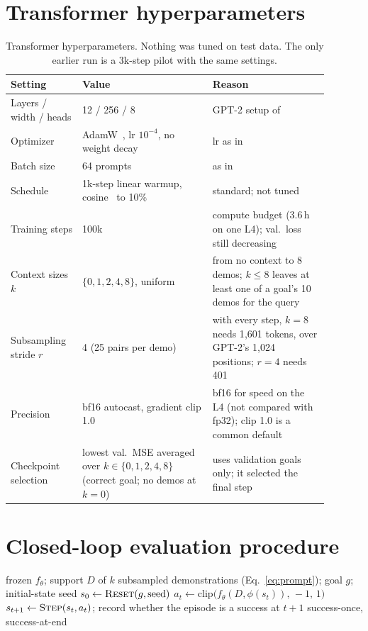 \section{Transformer hyperparameters}
\label{app:hparams}
\begin{table}[h]
\centering
\caption{Transformer hyperparameters. Nothing was tuned on test data. The only earlier run is a 3k-step pilot with the same settings.}
\label{tab:hparams}
\small
\begin{tabular}{p{0.19\linewidth}p{0.37\linewidth}p{0.33\linewidth}}
\toprule
Setting & Value & Reason \\
\midrule
Layers / width / heads & 12 / 256 / 8 & GPT-2 setup of~\cite{garg2022can} \\
Optimizer & AdamW~\cite{loshchilov2019adamw}, lr $10^{-4}$, no weight decay & lr as in~\cite{garg2022can} \\
Batch size & 64 prompts & as in~\cite{garg2022can} \\
Schedule & 1k-step linear warmup, cosine~\cite{loshchilov2017sgdr} to 10\% & standard; not tuned \\
Training steps & 100k & compute budget (3.6\,h on one L4); val.\ loss still decreasing \\
Context sizes $k$ & $\{0,1,2,4,8\}$, uniform & from no context to 8 demos; $k \le 8$ leaves at least one of a goal's 10 demos for the query \\
Subsampling stride $r$ & 4 (25 pairs per demo) & with every step, $k = 8$ needs 1{,}601 tokens, over GPT-2's 1{,}024 positions; $r = 4$ needs 401 \\
Precision & bf16 autocast, gradient clip 1.0 & bf16 for speed on the L4 (not compared with fp32); clip 1.0 is a common default \\
Checkpoint selection & lowest val.\ MSE averaged over $k \in \{0,1,2,4,8\}$ (correct goal; no demos at $k = 0$) & uses validation goals only; it selected the final step \\
\bottomrule
\end{tabular}
\end{table}

\section{Closed-loop evaluation procedure}
\label{app:procedures}
\begin{algorithm}[h]
\caption{Closed-loop evaluation of one condition (vectorized over the 512 episodes in practice)}
\label{alg:closed-loop}
\begin{algorithmic}[1]
\Require frozen $f_\theta$; support $D$ of $k$ subsampled demonstrations (Eq.~\ref{eq:prompt}); goal $g$; initial-state seed
\State $s_0 \gets \textsc{Reset}(g, \text{seed})$ 
  \State $a_t \gets \mathrm{clip}\big(f_\theta(D, \phi(s_t)),\, -1,\, 1\big)$ 
  \State $s_{t+1} \gets \textsc{Step}(s_t, a_t)$; record whether the episode is a success at $t+1$
\EndFor
\State \Return success-once, success-at-end
\end{algorithmic}
\end{algorithm}


